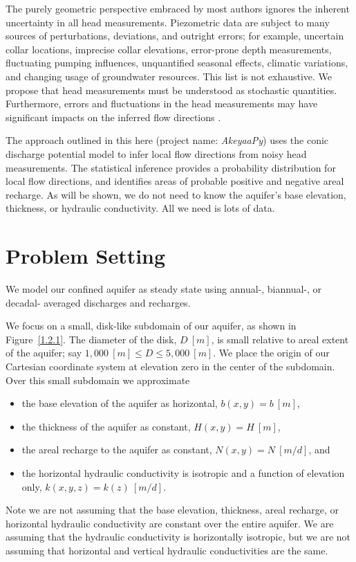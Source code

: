 \documentclass[12pt]{report}
\begin{document}
The purely geometric perspective embraced by most authors ignores the inherent uncertainty in all head measurements. Piezometric data are subject to many sources of perturbations, deviations, and outright errors; for example, uncertain collar locations, imprecise collar elevations, error-prone depth measurements, fluctuating pumping influences, unquantified seasonal effects, climatic variations, and changing usage of groundwater resources. This list is not exhaustive. We propose that head measurements must be understood as stochastic quantities. Furthermore, errors and fluctuations in the head measurements may have significant impacts on the inferred flow directions \citep[e.g.][]{Devlin2007}.

The approach outlined in this here (project name: {\em AkeyaaPy}) uses the conic discharge potential model to infer local flow directions from noisy head measurements. The statistical inference provides a probability distribution for local flow directions, and identifies areas of probable positive and negative areal recharge. As will be shown, we do not need to know the aquifer's base elevation, thickness, or hydraulic conductivity. All we need is lots of data.


\section{Problem Setting}
We model our confined aquifer as steady state using annual-, biannual-, or decadal- averaged discharges and recharges.

We focus on a small, disk-like subdomain of our aquifer, as shown in Figure~\ref{1.2.1}. The diameter of the disk, $D~[m]$, is small relative to areal extent of the aquifer; say $1,000~[m] \le D \le 5,000~[m]$. We place the origin of our Cartesian coordinate system at elevation zero in the center of the subdomain. Over this small subdomain we approximate
%
\begin{itemize}
    \item the base elevation of the aquifer as horizontal, $b(x,y) = b~[m]$,
    \item the thickness of the aquifer as constant, $H(x,y) = H~[m]$,
    \item the areal recharge to the aquifer as constant, $N(x,y) = N~[m/d]$, and
    \item the horizontal hydraulic conductivity is isotropic and a function of elevation only, $k(x,y,z) = k(z)~[m/d]$.
\end{itemize}
%
Note we are not assuming that the base elevation, thickness, areal recharge, or horizontal hydraulic conductivity are constant over the entire aquifer. We are assuming that the hydraulic conductivity is horizontally isotropic, but we are not assuming that horizontal and vertical hydraulic conductivities are the same.
\end{document}
